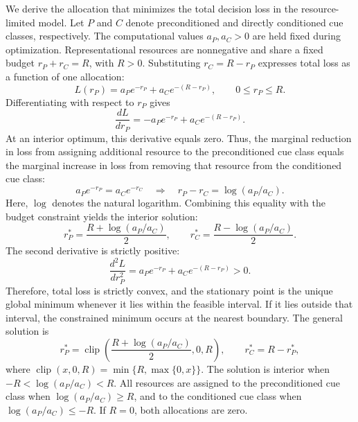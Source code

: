 \documentclass[12pt,letterpaper]{article}
\begin{document}
We derive the allocation that minimizes the total decision loss in the resource-limited model. Let $P$ and $C$ denote preconditioned and directly conditioned cue classes, respectively. The computational values $a_P,a_C>0$ are held fixed during optimization. Representational resources are nonnegative and share a fixed budget $r_P+r_C=R$, with $R>0$. Substituting $r_C=R-r_P$ expresses total loss as a function of one allocation:
\begin{equation}
L(r_P)=a_Pe^{-r_P}+a_Ce^{-(R-r_P)},\qquad 0\leq r_P\leq R.
\tag{S1}
\end{equation}
Differentiating with respect to $r_P$ gives
\begin{equation}
\frac{dL}{dr_P}=-a_Pe^{-r_P}+a_Ce^{-(R-r_P)}.
\tag{S2}
\end{equation}
At an interior optimum, this derivative equals zero. Thus, the marginal reduction in loss from assigning additional resource to the preconditioned cue class equals the marginal increase in loss from removing that resource from the conditioned cue class:
\begin{equation}
a_Pe^{-r_P}=a_Ce^{-r_C}
\quad\Longrightarrow\quad
r_P-r_C=\log(a_P/a_C).
\tag{S3}
\end{equation}
Here, $\log$ denotes the natural logarithm. Combining this equality with the budget constraint yields the interior solution:
\begin{equation}
r_P^*=\frac{R+\log(a_P/a_C)}{2},\qquad
r_C^*=\frac{R-\log(a_P/a_C)}{2}.
\tag{S4}
\end{equation}
The second derivative is strictly positive:
\begin{equation}
\frac{d^2L}{dr_P^2}=a_Pe^{-r_P}+a_Ce^{-(R-r_P)}>0.
\tag{S5}
\end{equation}
Therefore, total loss is strictly convex, and the stationary point is the unique global minimum whenever it lies within the feasible interval. If it lies outside that interval, the constrained minimum occurs at the nearest boundary. The general solution is
\begin{equation}
r_P^*=\operatorname{clip}\!\left(\frac{R+\log(a_P/a_C)}{2},0,R\right),\qquad
r_C^*=R-r_P^*,
\tag{S6}
\end{equation}
where $\operatorname{clip}(x,0,R)=\min\{R,\max\{0,x\}\}$. The solution is interior when $-R<\log(a_P/a_C)<R$. All resources are assigned to the preconditioned cue class when $\log(a_P/a_C)\geq R$, and to the conditioned cue class when $\log(a_P/a_C)\leq -R$. If $R=0$, both allocations are zero.
\end{document}
